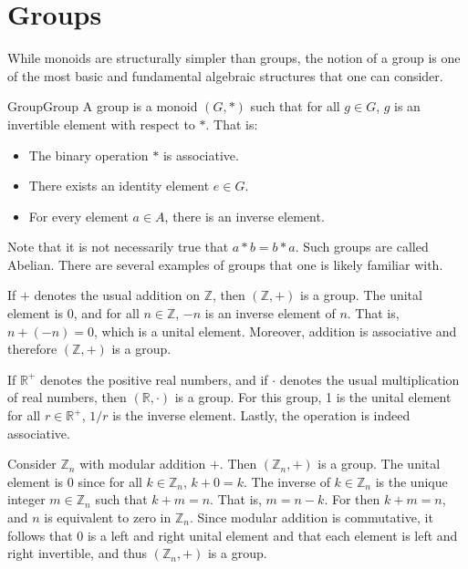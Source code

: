 \section{Groups}
    While monoids are structurally simpler than groups, the notion of a group
    is one of the most basic and fundamental algebraic structures that one can
    consider.
    \begin{fdefinition}{Group}{Group}
        A group is a \gls{monoid} $(G,*)$ such that for all $g\in{G}$, $g$ is
        an \gls{invertible element} with respect to $*$. That is:
        \begin{itemize}
            \item The binary operation $*$ is associative.
            \item There exists an identity element $e\in{G}$.
            \item For every element $a\in{A}$, there is an inverse element.
        \end{itemize}
    \end{fdefinition}
    Note that it is not necessarily true that $a*b=b*a$. Such groups are called
    Abelian. There are several examples of groups that one is likely familiar
    with.
    \begin{example}
        If $+$ denotes the usual addition on $\mathbb{Z}$, then
        $(\mathbb{Z},+)$ is a group. The unital element is 0, and for all
        $n\in\mathbb{Z}$, $\minus{n}$ is an inverse element of $n$. That is,
        $n+(\minus{n})=0$, which is a unital element. Moreover, addition is
        associative and therefore $(\mathbb{Z},+)$ is a group.
    \end{example}
    \begin{example}
        If $\mathbb{R}^{+}$ denotes the positive real numbers, and if $\cdot$
        denotes the usual multiplication of real numbers, then
        $(\mathbb{R},\cdot)$ is a group. For this group, 1 is the unital
        element for all $r\in\mathbb{R}^{+}$, $1/r$ is the inverse element.
        Lastly, the operation is indeed associative.
    \end{example}
    \begin{example}
        Consider $\mathbb{Z}_{n}$ with modular addition $+$. Then
        $(\mathbb{Z}_{n},+)$ is a group. The unital element is $0$ since for all
        $k\in\mathbb{Z}_{n}$, $k+0=k$. The inverse of $k\in\mathbb{Z}_{n}$ is
        the unique integer $m\in\mathbb{Z}_{n}$ such that $k+m=n$. That is,
        $m=n-k$. For then $k+m=n$, and $n$ is equivalent to zero in
        $\mathbb{Z}_{n}$. Since modular addition is commutative, it follows that
        $0$ is a left and right unital element and that each element is left and
        right invertible, and thus $(\mathbb{Z}_{n},+)$ is a group.
    \end{example}
